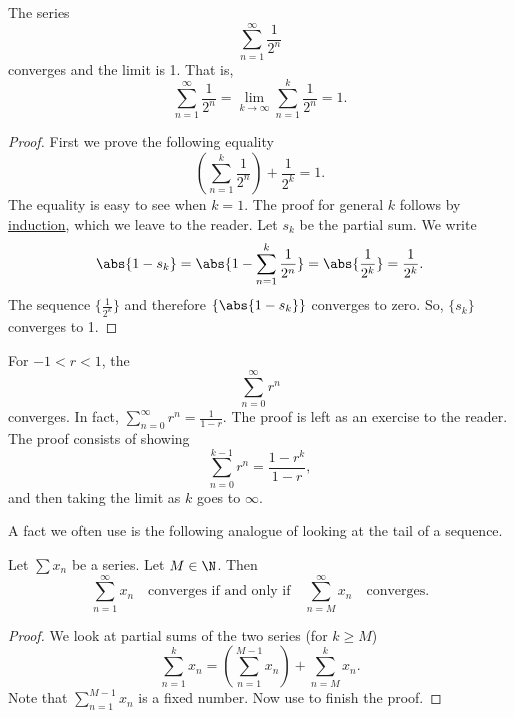 \documentclass[12pt]{book}
\begin{document}
\begin{example}
The series
\begin{equation*}
\sum_{n=1}^\infty \frac{1}{2^n}
\end{equation*}
converges and the limit is 1.
That is,
\begin{equation*}
\sum_{n=1}^\infty \frac{1}{2^n} = 
\lim_{k\to\infty} \sum_{n=1}^k \frac{1}{2^n} = 
1 .
\end{equation*}

\begin{proof} First we prove the following equality
\begin{equation*}
\left( \sum_{n=1}^k \frac{1}{2^n} \right)
+ \frac{1}{2^k}
= 1 .
\end{equation*}
The equality is easy to see when $k=1$.
The proof for general $k$
follows by \hyperref[induction:thm]{induction}, which we leave to the
reader.
Let $s_k$ be the partial sum.
We write
\begin{equation*}
\abs{
1 - s_k 
}
=
\abs{
1 - 
\sum_{n=1}^k \frac{1}{2^n}
}
=
\abs{\frac{1}{2^k}} = 
\frac{1}{2^k} .
\end{equation*}
The sequence $\{ \frac{1}{2^k} \}$ and therefore $\{ \abs{1-s_k} \}$
converges to zero.
So, $\{ s_k \}$ converges to 1.
\end{proof}
\end{example}

For $-1 < r < 1$, the \emph{}
\begin{equation*}
\sum_{n=0}^\infty r^n
\end{equation*}
converges.
In fact,
$\sum_{n=0}^\infty r^n = \frac{1}{1-r}$.
The proof is left as an exercise
to the reader.
The proof consists of showing 
\begin{equation*}
\sum_{n=0}^{k-1} r^n = \frac{1-r^k}{1-r} ,
\end{equation*}
and then taking the limit as $k$ goes to $\infty$.

A fact we often use is the following analogue of looking at the tail of
a sequence.

\begin{prop}
Let $\sum x_n$ be a series.
Let $M \in \N$.
Then
\begin{equation*}
\sum_{n=1}^\infty x_n \quad \text{converges if and only if} \quad
\sum_{n=M}^\infty x_n \quad \text{converges.}
\end{equation*}
\end{prop}

\begin{proof}
We look at partial sums of the two series (for $k \geq M$)
\begin{equation*}
\sum_{n=1}^{k} x_n
=
\left(
\sum_{n=1}^{M-1} x_n
\right)
+
\sum_{n=M}^{k} x_n .
\end{equation*}
Note that 
$\sum_{n=1}^{M-1} x_n$ is a fixed number.
Now use
 to finish the proof.
\end{proof}
\end{document}
